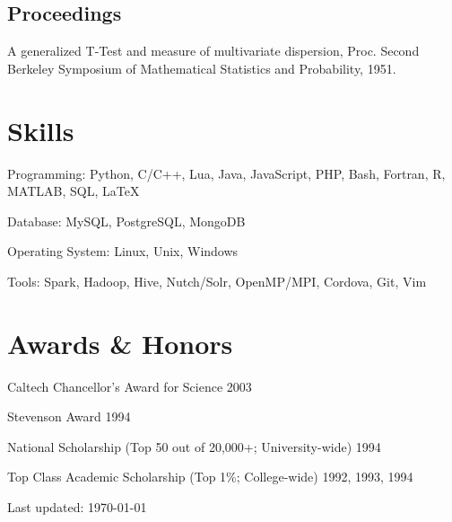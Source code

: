 \documentclass[letterpaper]{article}
\def\footerlink{}
\renewenvironment{itemize}{
  \begin{list}{}{
    \setlength{\leftmargin}{1.5em}
  }
}{
  \end{list}
}
\begin{document}
\subsection*{Proceedings}

\begin{itemize}
\item A generalized T-Test and measure of multivariate dispersion,
  Proc. Second Berkeley Symposium of Mathematical Statistics and
  Probability, 1951.
\end{itemize}

\section*{Skills}

\begin{itemize}
    \setlength\itemsep{0em}
    \item[$\bullet$] Programming: Python, C/C++, Lua, Java, JavaScript, PHP, Bash, Fortran, R, MATLAB, SQL, \LaTeX
    \item[$\bullet$] Database: MySQL, PostgreSQL, MongoDB
    \item[$\bullet$] Operating System: Linux, Unix, Windows
    \item[$\bullet$] Tools: Spark, Hadoop, Hive, Nutch/Solr, OpenMP/MPI, Cordova, Git, Vim
\end{itemize}

\section*{Awards \& Honors}

\begin{itemize}
  \setlength\itemsep{0em}
  \item[$\bullet$] Caltech Chancellor's Award for Science \hfill 2003
  \item[$\bullet$] Stevenson Award \hfill 1994
  \item[$\bullet$] National Scholarship (Top 50 out of 20,000+; University-wide) \hfill 1994
  \item[$\bullet$] Top Class Academic Scholarship (Top 1\%; College-wide) \hfill 1992, 1993, 1994
\end{itemize}

\bigskip

\begin{center}
  \begin{footnotesize}
    Last updated: \today \\
    \href{\footerlink}{\texttt{\footerlink}}
  \end{footnotesize}
\end{center}
\end{document}
